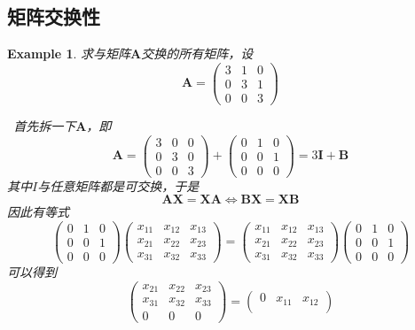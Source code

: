 \documentclass{article}
\newtheorem{example}[theorem]{Example}
\newcommand{\hints}{{\color{blue} \text{hints}}}
\newcommand{\mbf}[1]{\bm{#1}}
\begin{document}
\subsection{矩阵交换性}

\begin{example}
\rm 求与矩阵$\mbf{A}$交换的所有矩阵，设
$$
\mbf{A} = \begin{pmatrix}
3 & 1 & 0 \\
0 & 3 & 1 \\
0 & 0 & 3
\end{pmatrix}
$$

\hints\ 首先拆一下$\mbf{A}$，即
$$
\mbf{A} = \begin{pmatrix}
3 & 0 & 0 \\
0 & 3 & 0 \\
0 & 0 & 3
\end{pmatrix} + \begin{pmatrix}
0 & 1 & 0 \\
0 & 0 & 1 \\
0 & 0 & 0
\end{pmatrix} = 3\mbf{I} + \mbf{B}
$$
其中$I$与任意矩阵都是可交换，于是
$$
\mbf{A}\mbf{X} = \mbf{X}\mbf{A} \Leftrightarrow \mbf{B}\mbf{X} = \mbf{X}\mbf{B}
$$
因此有等式
$$
\begin{pmatrix}
0 & 1 & 0 \\
0 & 0 & 1 \\
0 & 0 & 0
\end{pmatrix} \begin{pmatrix}
x_{11} & x_{12} & x_{13} \\
x_{21} & x_{22} & x_{23} \\
x_{31} & x_{32} & x_{33}
\end{pmatrix}  = \begin{pmatrix}
x_{11} & x_{12} & x_{13} \\
x_{21} & x_{22} & x_{23} \\
x_{31} & x_{32} & x_{33}
\end{pmatrix} \begin{pmatrix}
0 & 1 & 0 \\
0 & 0 & 1 \\
0 & 0 & 0
\end{pmatrix} 
$$
可以得到
$$
\begin{pmatrix}
x_{21} & x_{22} & x_{23} \\
x_{31} & x_{32} & x_{33} \\
0 & 0 & 0
\end{pmatrix} = 
\begin{pmatrix}
0 & x_{11} & x_{12} \\

\end{pmatrix}$$
\end{example}
\end{document}

